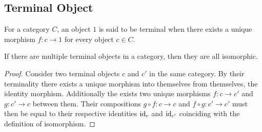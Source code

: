 \subsection{Terminal Object}

\begin{definition}
  For a category $C$, an object $1$ is said to be terminal when there exists a
  unique morphism $f: c\to 1$ for every object $c\in C$.
  \parencite{awodey:category_theory}
\end{definition}

\begin{theorem}\label{thm:term_obj_iso} If
  there are multiple terminal objects in a category, then they are all
  isomorphic.

  \begin{proof}
    Consider two terminal objects $c$ and $c'$ in the same category. By their
    terminality there exists a unique morphism into themselves from themselves,
    the identity morphism. Additionally the exists two unique morphisms $f:c\to
    c'$ and $g:c' \to c$ between them. Their compositions $g\circ f:c\to c$ and
    $f\circ g:c'\to c'$ must then be equal to their respective identities
    $\mathrm{id}_c$ and $\mathrm{id}_{c'}$ coinciding with the definition of isomorphism.
  \end{proof}
\end{theorem}

